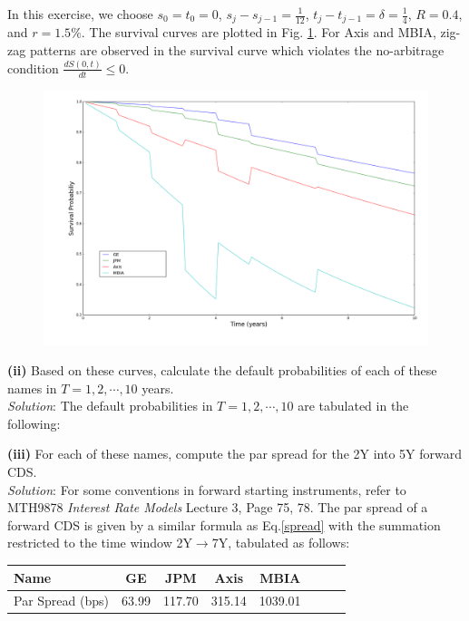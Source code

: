 \documentclass[paper=a4, fontsize=11pt]{scrartcl} %
\numberwithin{equation}{section} %
\numberwithin{figure}{section} %
\numberwithin{table}{section} %
\begin{document}
In this exercise, we choose $s_0=t_0=0$, $s_{j}-s_{j-1}=\frac{1}{12}$, $t_{j}-t_{j-1}=\delta=\frac{1}{4}$, $R=0.4$, and $r=1.5\%$. The survival curves
are plotted in Fig. \ref{survival}. For Axis and MBIA, zig-zag patterns are observed in the survival curve which violates the no-arbitrage condition
$\frac{dS(0,t)}{dt}\le 0$.
\begin{figure}[h]\label{survival}
\includegraphics[width=15cm]{survival_curve}
\end{figure}

\newpage
\textbf{(ii)} Based on these curves, calculate the default probabilities of each of these names in $T=1,2,\cdots, 10$
years.\\
\textit{Solution}: The default probabilities in $T=1,2,\cdots, 10$ are tabulated in the following:
\begin{center}
\end{center}


\textbf{(iii)} For each of these names, compute the par spread for the 2Y into 5Y forward CDS.\\
\textit{Solution}: For some conventions in forward starting instruments, refer to MTH9878 \textit{Interest Rate Models} Lecture 3, Page 75, 78. The 
par spread of a forward CDS is given by a similar formula as Eq.\ref{spread} with the summation restricted to the time window 2Y$\rightarrow$7Y, tabulated
as follows:
\begin{center}
\begin{tabular}{l*{6}{c}r}
\hline
Name              & GE & JPM & Axis & MBIA  \\
\hline
Par Spread (bps)	& 63.99	& 117.70 &	315.14	& 1039.01\\
\hline
\end{tabular}
\end{center}
\end{document}
